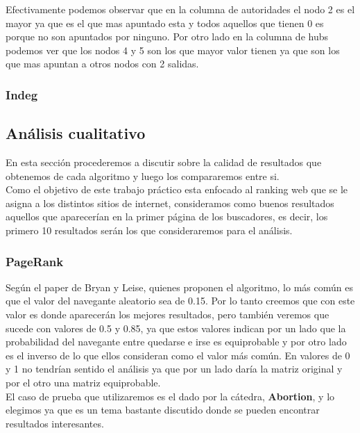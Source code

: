 Efectivamente podemos observar que en la columna de autoridades el nodo 2 es el mayor ya que es el que mas apuntado esta y todos aquellos que tienen 0 es porque no son apuntados por ninguno. Por otro lado en la columna de hubs podemos ver que los nodos 4 y 5 son los que mayor valor tienen ya que son los que mas apuntan a otros nodos con 2 salidas.

\subsubsection{Indeg}

\subsection{Análisis cualitativo}

En esta sección procederemos a discutir sobre la calidad de resultados que obtenemos de cada algoritmo y luego los compararemos entre si.\\
Como el objetivo de este trabajo práctico esta enfocado al ranking web que se le asigna a los distintos sitios de internet, consideramos como buenos resultados aquellos que aparecerían en la primer página de los buscadores, es decir, los primero 10 resultados serán los que consideraremos para el análisis.

\subsubsection{PageRank}
Según el paper de Bryan y Leise, quienes proponen el algoritmo, lo más común es que el valor del navegante aleatorio sea de 0.15. Por lo tanto creemos que con este valor es donde aparecerán los mejores resultados, pero también veremos que sucede con valores de 0.5 y 0.85, ya que estos valores indican por un lado que la probabilidad del navegante entre quedarse e irse es equiprobable y por otro lado es el inverso de lo que ellos consideran como el valor más común. En valores de 0 y 1 no tendrían sentido el análisis ya que por un lado daría la matriz original y por el otro una matriz equiprobable.\\
El caso de prueba que utilizaremos es el dado por la cátedra, \textbf{Abortion}, y lo elegimos ya que es un tema bastante discutido donde se pueden encontrar resultados interesantes.


